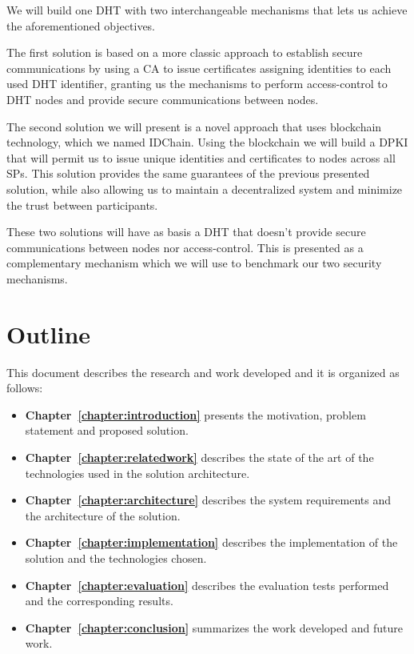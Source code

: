 We will build one DHT with two interchangeable mechanisms that lets us achieve the aforementioned objectives.

The first solution is based on a more classic approach to establish secure communications by using a \acl{CA} to issue certificates assigning identities to each used DHT identifier, granting us the mechanisms to perform access-control to \ac{DHT} nodes and provide secure communications between nodes.

The second solution we will present is a novel approach that uses blockchain technology, which we named IDChain.
Using the blockchain we will build a \ac{DPKI} that will permit us to issue unique identities and certificates to nodes across all \acp{SP}.
This solution provides the same guarantees of the previous presented solution, while also allowing us to maintain a decentralized system and minimize the trust between participants.

These two solutions will have as basis a \ac{DHT} that doesn't provide secure communications between nodes nor access-control.
This is presented as a complementary mechanism which we will use to benchmark our two security mechanisms.

\section{Outline}
This document describes the research and work developed and it is organized as follows:

\begin{itemize}
  \item \textbf{Chapter~\ref{chapter:introduction}} presents the motivation, problem statement and proposed solution.
  \item \textbf{Chapter~\ref{chapter:relatedwork}} describes the state of the art of the technologies used in the solution architecture.
  \item \textbf{Chapter~\ref{chapter:architecture}} describes the system requirements and the architecture of the solution.
  \item \textbf{Chapter~\ref{chapter:implementation}} describes the implementation of the solution and the technologies chosen.
  \item \textbf{Chapter~\ref{chapter:evaluation}} describes the evaluation tests performed and the corresponding results.
  \item \textbf{Chapter~\ref{chapter:conclusion}} summarizes the work developed and future work.
\end{itemize}

\cleardoublepage
